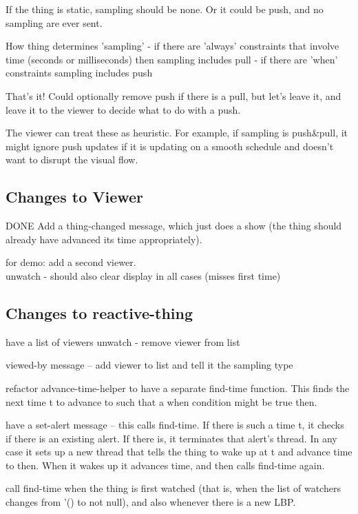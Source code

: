 \documentclass{article}
\begin{document}
If the thing is static, sampling should be none.  Or it could be
push, and no sampling are ever sent.

How thing determines 'sampling'
 - if there are 'always' constraints that involve time (seconds or
   milliseconds) then sampling includes pull
 - if there are 'when' constraints sampling includes push

That's it!  Could optionally remove push if there is a pull, but let's
leave it, and leave it to the viewer to decide what to do with a push.

The viewer can treat these as heuristic.  For example, if sampling
is push\&pull, it might ignore push updates if it is updating on a
smooth schedule and doesn't want to disrupt the visual flow.

\subsection{Changes to Viewer}

DONE Add a thing-changed message, which just does a show (the thing should
already have advanced its time appropriately).

for demo: add a second viewer. \\
unwatch - should also clear display in all cases (misses first time)

\subsection{Changes to reactive-thing}

have a list of viewers
unwatch - remove viewer from list

viewed-by message -- add viewer to list  and tell it the sampling type

refactor advance-time-helper to have a separate find-time function.  This
finds the next time t to advance to such that a when condition might be
true then.

have a set-alert message -- this calls find-time.  If there is such a time
t, it checks if there is an existing alert.  If there is, it terminates
that alert's thread.  In any case it sets up a new thread that tells the
thing to wake up at t and advance time to then.  When it wakes up it
advances time, and then calls find-time again.

call find-time when the thing is first watched (that is, when the list of
watchers changes from '() to not null), and also whenever there is a new
LBP.
\end{document}
